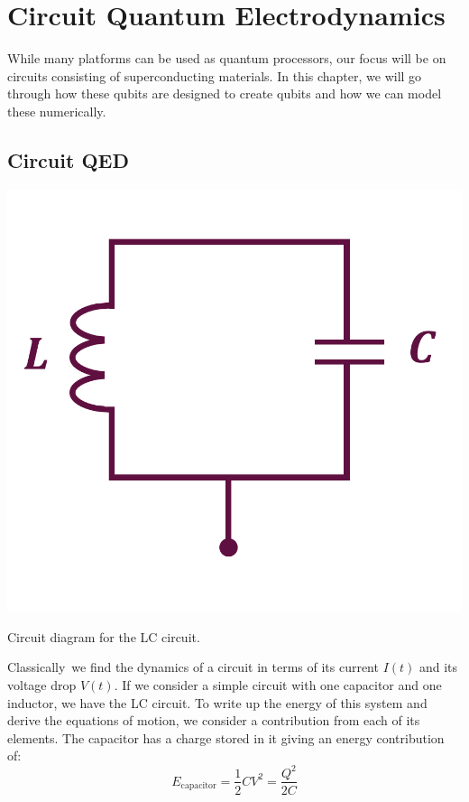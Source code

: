 \chapter{Circuit Quantum Electrodynamics}\label{chap:cQED}
While many platforms can be used as quantum processors, our focus will be on circuits consisting of superconducting materials. In this chapter, we will go through how these qubits are designed to create qubits and how we can model these numerically. \\

\section{Circuit QED}
\begin{marginfigure}[5 cm]
    \includegraphics[width = \linewidth]{tex/fig_for_text/LC_circuit.png}
    \caption{Circuit diagram for the LC circuit.}
\end{marginfigure}
Classically\, we find the dynamics of a circuit in terms of its current $I(t)$ and its voltage drop $V(t)$. If we consider a simple circuit with one capacitor and one inductor, we have the LC circuit. To write up the energy of this system and derive the equations of motion, we consider a contribution from each of its elements. The capacitor has a charge stored in it giving an energy contribution of:
\begin{equation}
    E_{\text{capacitor}} = \frac{1}{2} CV^2 = \frac{Q^2}{2C}
\end{equation}
